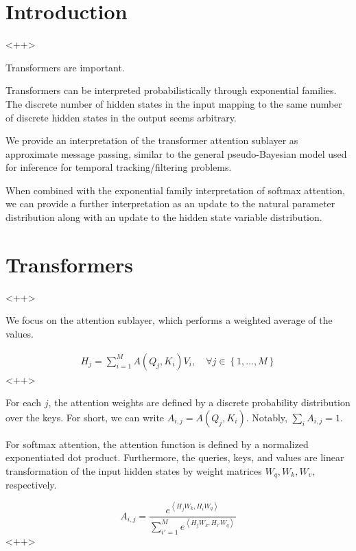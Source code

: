 \documentclass[a4paper]{article}
\begin{document}
\section{Introduction}<++>

Transformers are important.

Transformers can be interpreted probabilistically through exponential families.  
The discrete number of hidden states in the input mapping to the same number of discrete hidden states in the output seems arbitrary.

We provide an interpretation of the transformer attention sublayer as approximate message passing, similar to the general pseudo-Bayesian model used for inference for temporal tracking/filtering problems.

When combined with the exponential family interpretation of softmax attention, we can provide a further interpretation as an update to the natural parameter distribution along with an update to the hidden state variable distribution.

\section{Transformers}<++>

We focus on the attention sublayer, which performs a weighted average of the values.  

\begin{equation}
  \begin{split}
    H_j = \sum_{i=1}^M A \left( Q_j, K_i \right) V_i, \quad \forall j \in \left\{ 1, \ldots, M \right\}
  \end{split}
  \label{<++>}
\end{equation}<++>

For each $j$, the attention weights are defined by a discrete probability distribution over the keys.  
For short, we can write $ A_{i,j} = A \left( Q_j, K_i \right) $.  
Notably, $ \sum_i A_{i,j} = 1 $.

For softmax attention, the attention function is defined by a normalized exponentiated dot product.
Furthermore, the queries, keys, and values are linear transformation of the input hidden states by weight matrices $W_q, W_k, W_v$, respectively.

\begin{equation}
  A_{i,j} = \frac{ e^{ \left< H_j W_k, H_i W_q \right> } }{ \sum_{i'=1}^M e^{ \left< H_j W_k, H_{i'} W_q \right> } }
  \label{<++>}
\end{equation}<++>
\end{document}
